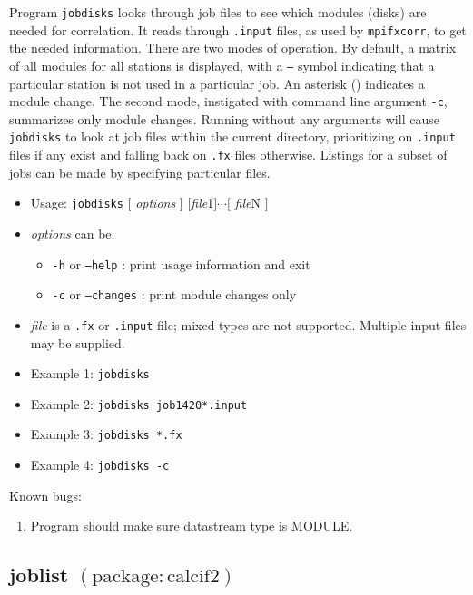Program {\tt jobdisks} looks through job files to see which modules (disks) are needed for correlation.
It reads through {\tt .input} files, as used by {\tt mpifxcorr}, to get the needed information.
There are two modes of operation.
By default, a matrix of all modules for all stations is displayed, with a {\tt --} symbol indicating that a particular station is not used in a particular job.
An asterisk ({\tt *}) indicates a module change.
The second mode, instigated with command line argument {\tt -c}, summarizes only module changes.
Running without any arguments will cause {\tt jobdisks} to look at job files within the current directory, prioritizing on {\tt .input} files if any exist and falling back on {\tt .fx} files otherwise.
Listings for a subset of jobs can be made by specifying particular files.

\begin{itemize}
\item[] Usage: {\tt jobdisks} $[$ {\em options} $]$ $[${\em file}1$] \cdots [$ {\em file}N $]$
\item[] {\em options} can be:
\begin{itemize}
\item[] {\tt -h} or {\tt --help} : print usage information and exit
\item[] {\tt -c} or {\tt --changes} : print module changes only
\end{itemize}
\item[] {\em file} is a {\tt .fx} or {\tt .input} file; mixed types are not supported. 
Multiple input files may be supplied.
\item[] Example 1: {\tt jobdisks}
\item[] Example 2: {\tt jobdisks job1420*.input}
\item[] Example 3: {\tt jobdisks *.fx}
\item[] Example 4: {\tt jobdisks -c}
\end{itemize}


\noindent
Known bugs:
\begin{enumerate}
\item Program should make sure datastream type is MODULE.
\end{enumerate}







\subsection{joblist {\small $\mathrm{(package: calcif2)}$}} \label{sec:joblist}

